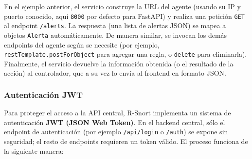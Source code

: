 \documentclass[11pt,a4paper,twoside]{report}
\begin{document}
En el ejemplo anterior, el servicio construye la URL del agente (usando su IP y puerto conocido, aquí \texttt{8000} por defecto para FastAPI) y realiza una petición \texttt{GET} al endpoint \texttt{/alerts}. La respuesta (una lista de alertas JSON) se mapea a objetos \texttt{Alerta} automáticamente. De manera similar, se invocan los demás endpoints del agente según se necesite (por ejemplo, \texttt{restTemplate.postForObject} para agregar una regla, o \texttt{delete} para eliminarla). Finalmente, el servicio devuelve la información obtenida (o el resultado de la acción) al controlador, que a su vez lo envía al frontend en formato JSON.

\subsubsection*{Autenticación JWT}

Para proteger el acceso a la API central, R-Snort implementa un sistema de autenticación \textbf{JWT (JSON Web Token)}. En el backend central, sólo el endpoint de autenticación (por ejemplo \texttt{/api/login} o \texttt{/auth}) se expone sin seguridad; el resto de endpoints requieren un token válido. El proceso funciona de la siguiente manera:
\end{document}
